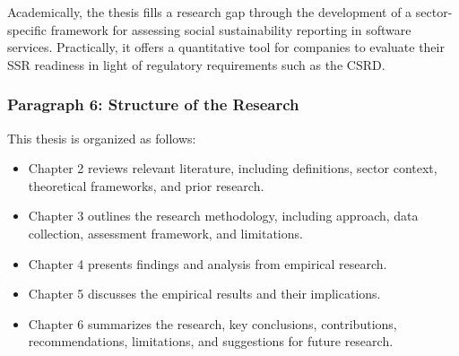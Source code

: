 Academically, the thesis fills a research gap through the 
development of a sector-specific framework for assessing social sustainability
reporting in software services. Practically, it offers a quantitative tool 
for companies to evaluate their SSR readiness in light of regulatory 
requirements such as the CSRD.

\subsubsection{Paragraph 6: Structure of the Research}
This thesis is organized as follows:
\begin{itemize}
    \item Chapter 2 reviews relevant literature, including definitions, 
    sector context, theoretical frameworks, and prior research.
    \item Chapter 3 outlines the research methodology, including approach, 
    data collection, assessment framework, and limitations.
    \item Chapter 4 presents findings and analysis from empirical research.
    \item Chapter 5 discusses the empirical results and their implications.
    \item Chapter 6 summarizes the research, key conclusions, contributions, 
    recommendations, limitations, and suggestions for future research.
\end{itemize}